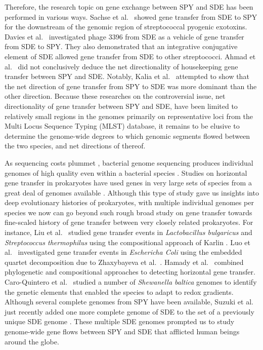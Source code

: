 \documentclass[10pt]{article}
\let\citep\cite
\let\citet\cite
\begin{document}
Therefore, the research topic on gene exchange between SPY and SDE has been
performed in various ways. Sachse et al.\ \citet{Sachse2002} showed gene transfer from SDE to
SPY for the downstream of the genomic region of streptococcal pyogenic
exotoxins. Davies et al.\ \citet{Davies2007} investigated phage 3396 from SDE as a vehicle of
gene transfer from SDE to SPY. They \citet{Davies2009} also demonstrated that an
integrative conjugative element of SDE allowed gene transfer from SDE to other
streptococci. Ahmad et al.\ \citet{Ahmad2009} did not conclusively deduce the net
directionality of housekeeping gene transfer between SPY and SDE.  Notably,
Kalia et al.\ \citet{Kalia2001} attempted to show that the net direction of gene transfer from
SPY to SDE was more dominant than the other direction.  Because these researches
on the controversial issue, net directionality of gene transfer between SPY and
SDE, have been limited to relatively small regions in the genomes primarily on
representative loci from the Multi Locus Sequence Typing (MLST) database, it
remains to be elusive to determine the genome-wide degrees to which genomic
segments flowed between the two species, and net directions of thereof.

As sequencing costs plummet \citep{Mardis2011}, bacterial genome sequencing
produces individual genomes of high quality even within a bacterial species
\citep{Tettelin2009a}.  Studies on horizontal gene transfer in prokaryotes have
used genes in very large sets of species from a great deal of genomes available 
\citep{Koonin2001}.  Although this type of study gave us insights into deep
evolutionary histories of prokaryotes, with multiple individual genomes per
species we now can go beyond such rough broad study on gene transfer towards
fine-scaled history of gene transfer between very closely related prokaryotes.
For instance, Liu et al.\ \citet{Liu2009} studied gene transfer events in
\textit{Lactobacillus bulgaricus} and \textit{Streptococcus thermophilus} using
the compositional approach of Karlin \citet{Karlin2001}. Luo et al.\ \citet{Luo2011} investigated
gene transfer events in \textit{Eschericha Coli} using the embedded quartet
decomposition due to Zhaxybayeva et al.\ \citet{Zhaxybayeva2006}. Hamady et al.\ \citet{Hamady2006} combined
phylogenetic and compositional approaches to detecting horizontal gene transfer.
Caro-Quintero et al.\ \citet{Caro-Quintero2011} studied a number of \textit{Shewanella baltica}
genomes to identify the genetic elements that enabled the species to adapt to
redox gradients.  Although several complete genomes from SPY have been
available, Suzuki et al.\ \citet{Suzuki2011} just recently added one more complete genome of
SDE to the set of a previously unique SDE genome \citep{Shimomura2011}. These
multiple SDE genomes prompted us to study genome-wide gene flows between SPY and
SDE that afflicted human beings around the globe.
\end{document}
